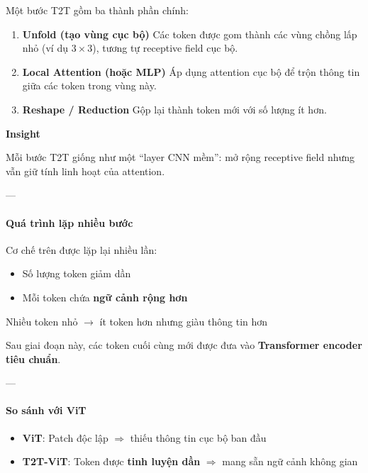 Một bước T2T gồm ba thành phần chính:

\begin{enumerate}
	\item \textbf{Unfold (tạo vùng cục bộ)}  
	Các token được gom thành các vùng chồng lấp nhỏ (ví dụ $3 \times 3$), tương tự receptive field cục bộ.
	
	\item \textbf{Local Attention (hoặc MLP)}  
	Áp dụng attention cục bộ để trộn thông tin giữa các token trong vùng này.
	
	\item \textbf{Reshape / Reduction}  
	Gộp lại thành token mới với số lượng ít hơn.
\end{enumerate}

\begin{mdframed}[style=infobox]
	\textbf{Insight}
	
	Mỗi bước T2T giống như một “layer CNN mềm”:  
	mở rộng receptive field nhưng vẫn giữ tính linh hoạt của attention.
\end{mdframed}

---

\paragraph{Quá trình lặp nhiều bước}

Cơ chế trên được lặp lại nhiều lần:

\begin{itemize}
	\item Số lượng token giảm dần
	\item Mỗi token chứa \textbf{ngữ cảnh rộng hơn}
\end{itemize}

\begin{center}
	Nhiều token nhỏ $\rightarrow$ ít token hơn nhưng giàu thông tin hơn
\end{center}

Sau giai đoạn này, các token cuối cùng mới được đưa vào \textbf{Transformer encoder tiêu chuẩn}.

---

\paragraph{So sánh với ViT}

\begin{itemize}
	\item \textbf{ViT}:  
	Patch độc lập $\Rightarrow$ thiếu thông tin cục bộ ban đầu
	
	\item \textbf{T2T-ViT}:  
	Token được \textbf{tinh luyện dần} $\Rightarrow$ mang sẵn ngữ cảnh không gian
\end{itemize}

